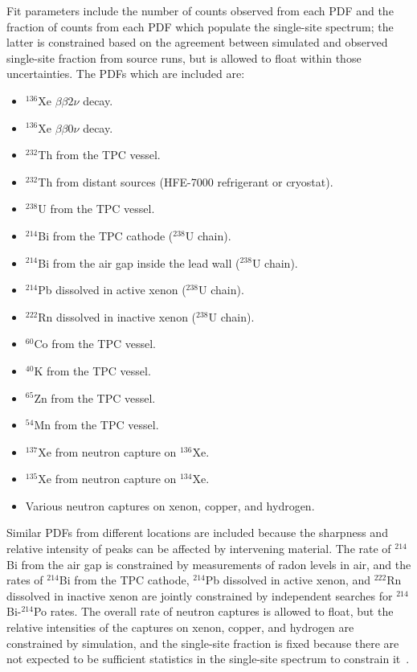 Fit parameters include the number of counts observed from each PDF and the fraction of counts from each PDF which populate the single-site spectrum; the latter is constrained based on the agreement between simulated and observed single-site fraction from source runs, but is allowed to float within those uncertainties.  The PDFs which are included are:
\begin{itemize}
\item $^{136}$Xe $\beta\beta 2\nu$ decay.
\item $^{136}$Xe $\beta\beta 0\nu$ decay.
\item $^{232}$Th from the TPC vessel.
\item $^{232}$Th from distant sources (HFE-7000 refrigerant or cryostat).
\item $^{238}$U from the TPC vessel.
\item $^{214}$Bi from the TPC cathode ($^{238}$U chain).
\item $^{214}$Bi from the air gap inside the lead wall ($^{238}$U chain).
\item $^{214}$Pb dissolved in active xenon ($^{238}$U chain).
\item $^{222}$Rn dissolved in inactive xenon ($^{238}$U chain).
\item $^{60}$Co from the TPC vessel.
\item $^{40}$K from the TPC vessel.
\item $^{65}$Zn from the TPC vessel.
\item $^{54}$Mn from the TPC vessel.
\item $^{137}$Xe from neutron capture on $^{136}$Xe.
\item $^{135}$Xe from neutron capture on $^{134}$Xe.
\item Various neutron captures on xenon, copper, and hydrogen.
\end{itemize}
Similar PDFs from different locations are included because the sharpness and relative intensity of peaks can be affected by intervening material.  The rate of $^{214}$Bi from the air gap is constrained by measurements of radon levels in air, and the rates of $^{214}$Bi from the TPC cathode, $^{214}$Pb dissolved in active xenon, and $^{222}$Rn dissolved in inactive xenon are jointly constrained by independent searches for $^{214}$Bi-$^{214}$Po rates.  The overall rate of neutron captures is allowed to float, but the relative intensities of the captures on xenon, copper, and hydrogen are constrained by simulation, and the single-site fraction is fixed because there are not expected to be sufficient statistics in the single-site spectrum to constrain it~\cite{FittingDocument}.

